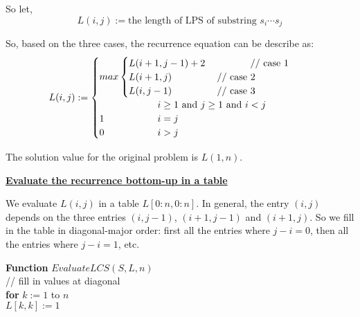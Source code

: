 \documentclass[11pt]{article}
\begin{document}
\begin{enumerate}
  So let,
  \begin{equation}
    L(i, j) := \text{the length of LPS of substring } s_i \cdots s_j
  \end{equation}

  So, based on the three cases, the recurrence equation can be
  describe as:
  \begin{equation}
    L(i,j) := \begin{cases}
      max \begin{cases}
        L(i+1, j-1) + 2 \text{ \hspace{4em} // case 1} \\
        L(i+1, j) \text{ \hspace{4em} // case 2} \\
        L(i, j-1) \text{ \hspace{4em} // case 3} \\
      \end{cases}\\
      \-\hspace{6em} i \geq 1 \text{ and } j \geq 1 \text{ and } i < j \\

      1 \-\hspace{5.5em} i = j \\
      0 \-\hspace{5.5em} i > j \\
    \end{cases}
  \end{equation}

  The solution value for the original problem is $L(1, n)$.

  \underline{\textbf{Evaluate the recurrence bottom-up in a table}}

  We evaluate $L(i,j)$ in a table $L[0:n, 0:n]$.
  In general, the entry $(i,j)$ depends on the three entries $(i,
  j-1)$, $(i+1, j-1)$ and $(i+1, j)$. So we fill in the table 
  in diagonal-major order: first all the entries where $j-i=0$, then
  all the entries where $j-i=1$, etc.

  \textbf{Function} $EvaluateLCS(S, L, n)$\\
  \-\hspace{2em} // fill in values at diagonal\\
  \-\hspace{2em} \textbf{for} $k := 1$ to $n$\\
  \-\hspace{4em} $L[k,k] := 1$ \\


\end{enumerate}
\end{document}
